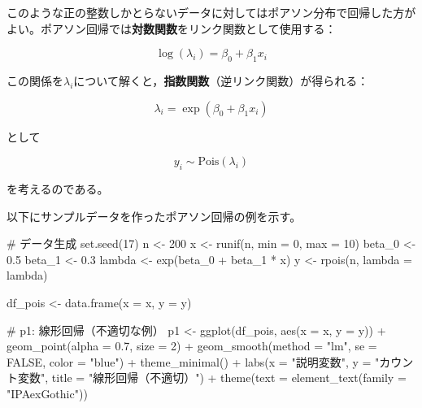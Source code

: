 \documentclass[
  a4paper,
]{ltjsbook}
\newenvironment{Shaded}{\begin{snugshade}}{\end{snugshade}}
\newcommand{\AttributeTok}[1]{\textcolor[rgb]{0.40,0.45,0.13}{#1}}
\newcommand{\CommentTok}[1]{\textcolor[rgb]{0.37,0.37,0.37}{#1}}
\newcommand{\ConstantTok}[1]{\textcolor[rgb]{0.56,0.35,0.01}{#1}}
\newcommand{\DecValTok}[1]{\textcolor[rgb]{0.68,0.00,0.00}{#1}}
\newcommand{\FloatTok}[1]{\textcolor[rgb]{0.68,0.00,0.00}{#1}}
\newcommand{\FunctionTok}[1]{\textcolor[rgb]{0.28,0.35,0.67}{#1}}
\newcommand{\NormalTok}[1]{\textcolor[rgb]{0.00,0.23,0.31}{#1}}
\newcommand{\OtherTok}[1]{\textcolor[rgb]{0.00,0.23,0.31}{#1}}
\newcommand{\SpecialCharTok}[1]{\textcolor[rgb]{0.37,0.37,0.37}{#1}}
\newcommand{\StringTok}[1]{\textcolor[rgb]{0.13,0.47,0.30}{#1}}
\begin{document}
このような正の整数しかとらないデータに対してはポアソン分布で回帰した方がよい。ポアソン回帰では\textbf{対数関数}をリンク関数として使用する：

\[
\log(\lambda_i) = \beta_0 + \beta_1 x_i
\]

この関係を\(\lambda_i\)について解くと，\textbf{指数関数}（逆リンク関数）が得られる：

\[ \lambda_i = \exp(\beta_0 + \beta_1 x_i) \]

として

\[ y_i \sim \text{Pois}(\lambda_i) \]

を考えるのである。

以下にサンプルデータを作ったポアソン回帰の例を示す。

\begin{Shaded}
\begin{Highlighting}[]
\CommentTok{\# データ生成}
\FunctionTok{set.seed}\NormalTok{(}\DecValTok{17}\NormalTok{)}
\NormalTok{n }\OtherTok{\textless{}{-}} \DecValTok{200}
\NormalTok{x }\OtherTok{\textless{}{-}} \FunctionTok{runif}\NormalTok{(n, }\AttributeTok{min =} \DecValTok{0}\NormalTok{, }\AttributeTok{max =} \DecValTok{10}\NormalTok{)}
\NormalTok{beta\_0 }\OtherTok{\textless{}{-}} \FloatTok{0.5}
\NormalTok{beta\_1 }\OtherTok{\textless{}{-}} \FloatTok{0.3}
\NormalTok{lambda }\OtherTok{\textless{}{-}} \FunctionTok{exp}\NormalTok{(beta\_0 }\SpecialCharTok{+}\NormalTok{ beta\_1 }\SpecialCharTok{*}\NormalTok{ x)}
\NormalTok{y }\OtherTok{\textless{}{-}} \FunctionTok{rpois}\NormalTok{(n, }\AttributeTok{lambda =}\NormalTok{ lambda)}

\NormalTok{df\_pois }\OtherTok{\textless{}{-}} \FunctionTok{data.frame}\NormalTok{(}\AttributeTok{x =}\NormalTok{ x, }\AttributeTok{y =}\NormalTok{ y)}

\CommentTok{\# p1: 線形回帰（不適切な例）}
\NormalTok{p1 }\OtherTok{\textless{}{-}} \FunctionTok{ggplot}\NormalTok{(df\_pois, }\FunctionTok{aes}\NormalTok{(}\AttributeTok{x =}\NormalTok{ x, }\AttributeTok{y =}\NormalTok{ y)) }\SpecialCharTok{+}
    \FunctionTok{geom\_point}\NormalTok{(}\AttributeTok{alpha =} \FloatTok{0.7}\NormalTok{, }\AttributeTok{size =} \DecValTok{2}\NormalTok{) }\SpecialCharTok{+}
    \FunctionTok{geom\_smooth}\NormalTok{(}\AttributeTok{method =} \StringTok{"lm"}\NormalTok{, }\AttributeTok{se =} \ConstantTok{FALSE}\NormalTok{, }\AttributeTok{color =} \StringTok{"blue"}\NormalTok{) }\SpecialCharTok{+}
    \FunctionTok{theme\_minimal}\NormalTok{() }\SpecialCharTok{+}
    \FunctionTok{labs}\NormalTok{(}\AttributeTok{x =} \StringTok{"説明変数"}\NormalTok{, }\AttributeTok{y =} \StringTok{"カウント変数"}\NormalTok{, }\AttributeTok{title =} \StringTok{"線形回帰（不適切）"}\NormalTok{) }\SpecialCharTok{+}
    \FunctionTok{theme}\NormalTok{(}\AttributeTok{text =} \FunctionTok{element\_text}\NormalTok{(}\AttributeTok{family =} \StringTok{"IPAexGothic"}\NormalTok{))}


\end{Highlighting}
\end{Shaded}
\end{document}
